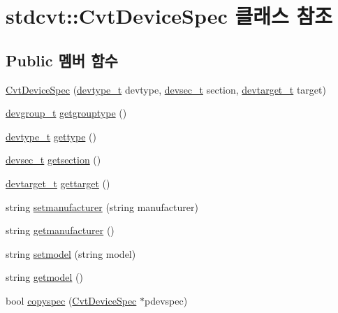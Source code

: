 \hypertarget{classstdcvt_1_1CvtDeviceSpec}{}\section{stdcvt\+:\+:Cvt\+Device\+Spec 클래스 참조}
\label{classstdcvt_1_1CvtDeviceSpec}
\subsection*{Public 멤버 함수}
\begin{DoxyCompactItemize}
\item 
\hyperlink{classstdcvt_1_1CvtDeviceSpec_aa4e65cb8c2c999a88c8c0af4973a3652}{Cvt\+Device\+Spec} (\hyperlink{cvtcode_8h_ae8e34073e35cef0bb47c7fa535fc638b}{devtype\+\_\+t} devtype, \hyperlink{cvtcode_8h_a268eebb73363e24b9e65fd51973bd9c0}{devsec\+\_\+t} section, \hyperlink{cvtcode_8h_a2b37fd5cc4d40c0b8c4b987c271e5ceb}{devtarget\+\_\+t} target)
\item 
\hyperlink{cvtcode_8h_a2b770a849c30d4f4786dc06b59aef47c}{devgroup\+\_\+t} \hyperlink{classstdcvt_1_1CvtDeviceSpec_a7a122123db7bc9350b89910f8c03b453}{getgrouptype} ()
\item 
\hyperlink{cvtcode_8h_ae8e34073e35cef0bb47c7fa535fc638b}{devtype\+\_\+t} \hyperlink{classstdcvt_1_1CvtDeviceSpec_aebd3553d080f82f7e71d0c145a4e811b}{gettype} ()
\item 
\hyperlink{cvtcode_8h_a268eebb73363e24b9e65fd51973bd9c0}{devsec\+\_\+t} \hyperlink{classstdcvt_1_1CvtDeviceSpec_a1a0224f68343b0ff664492f67b102b02}{getsection} ()
\item 
\hyperlink{cvtcode_8h_a2b37fd5cc4d40c0b8c4b987c271e5ceb}{devtarget\+\_\+t} \hyperlink{classstdcvt_1_1CvtDeviceSpec_acae6e3ba6033ca095b723a541267eab4}{gettarget} ()
\item 
string \hyperlink{classstdcvt_1_1CvtDeviceSpec_a492062d0e23014d77efd75b56d8d21ce}{setmanufacturer} (string manufacturer)
\item 
string \hyperlink{classstdcvt_1_1CvtDeviceSpec_a5aa3ec5557f3a2da7763d13d0da7740c}{getmanufacturer} ()
\item 
string \hyperlink{classstdcvt_1_1CvtDeviceSpec_ad1d1d18f459c2648f325407774f0a44b}{setmodel} (string model)
\item 
string \hyperlink{classstdcvt_1_1CvtDeviceSpec_a9b9a75973c369a9488122848c6a696e8}{getmodel} ()
\item 
bool \hyperlink{classstdcvt_1_1CvtDeviceSpec_a82038a625e1a8705c668ad07a01b5b1f}{copyspec} (\hyperlink{classstdcvt_1_1CvtDeviceSpec}{Cvt\+Device\+Spec} $\ast$pdevspec)

\end{DoxyCompactItemize}
